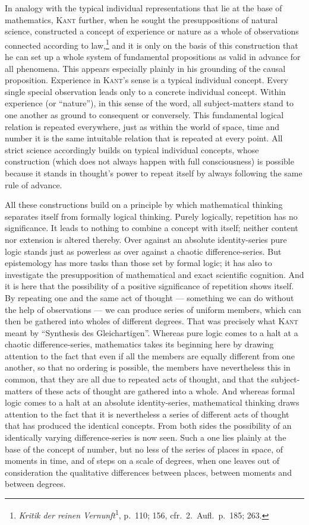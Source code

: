 \documentclass[12pt]{book}
\newcommand{\opage}[1]{\marginnote{\footnotesize\textit{[#1]}}}
\begin{document}
In analogy with the typical individual representations that lie at the base of
mathematics, \textsc{Kant} further, when he sought the presuppositions of natural
science, constructed a concept of experience or nature as a whole of observations
connected according to law,\footnote{\textit{Kritik der reinen
Vernunft}\textsuperscript{1}, p.\ 110; 156, cfr.\ 2.\ Aufl.\ p.\ 185; 263.} and it
is only on the basis of this construction that he can set up a whole system of
fundamental propositions as valid in advance for all phenomena. This appears
especially plainly in his grounding of the causal proposition. Experience in
\textsc{Kant}'s sense is a typical individual concept. Every single special
observation leads only to a concrete individual concept. Within experience (or
``nature''), in this sense of the word, all subject-matters stand to one another
as ground to consequent or conversely. This fundamental logical relation is
repeated everywhere, just as within the world of space, time and number it is
the same intuitable relation that is repeated at every point. All strict science
accordingly builds on typical individual concepts, whose construction (which does
not always happen with full consciousness) is possible because it stands in
thought's power to repeat itself by always following the same rule of
advance.

All these constructions build on a principle by which mathematical thinking
separates itself from formally logical thinking. Purely logically, repetition has
no significance. It leads to nothing to combine a concept with itself; neither
content nor extension is altered thereby. Over against an absolute identity-series
pure logic stands just as powerless as over against a chaotic difference-series.
But epistemology has more tasks than those set by formal logic; it has also to
investigate the presupposition of mathematical and exact scientific cognition.
And it is here that the possibility of a positive significance of repetition
shows itself. By repeating one and the same act of thought --- something we can
do without the help of observations --- we can produce series of uniform members,
which can then be gathered into wholes of different degrees. That was precisely
what \textsc{Kant} meant by ``Synthesis des Gleichartigen''. Whereas pure logic
comes to a halt at a chaotic difference-series, mathematics takes its beginning
here by drawing attention to the fact that even if all the members are equally
different from one another, so that no ordering is possible, the members have
nevertheless this in common, that they are all due to repeated acts of thought,
and that the subject-matters of these acts of thought are gathered into a whole.
And whereas formal logic comes to a halt at an absolute identity-series,
mathematical thinking draws attention to the fact that it is nevertheless a
series of different acts of thought that has produced the identical concepts.
From both sides the possibility of an identically varying difference-series is
now seen. Such a one lies plainly at the base of the concept of number, but no
\opage{36}less of the series of places in space, of moments in time, and of steps on a
scale of degrees, when one leaves out of consideration the qualitative
differences between places, between moments and between degrees.
\end{document}
